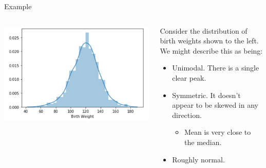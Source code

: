 \documentclass[aspectratio=169]{../latex_main/tntbeamer}  %
\begin{document}
    
    
    \begin{frame}{Example}
        \begin{columns}
            \begin{column}{.5\textwidth}
            
                       \centering
                       \includegraphics[scale=.6]{Bild36}
                   
            \end{column}
            
            
            \begin{column}{.4\textwidth}
                   Consider the distribution of birth weights shown to the left. We might describe this as being:
                   \begin{itemize}
                       \item Unimodal. There is a single clear peak.
                       \item Symmetric. It doesn’t appear to be skewed in any direction.
                       \begin{itemize}
                           \item Mean is very close to the median.
                       \end{itemize}
                       \item Roughly normal.
                   \end{itemize}
            \end{column}
        \end{columns}
    \end{frame}
\end{document}
